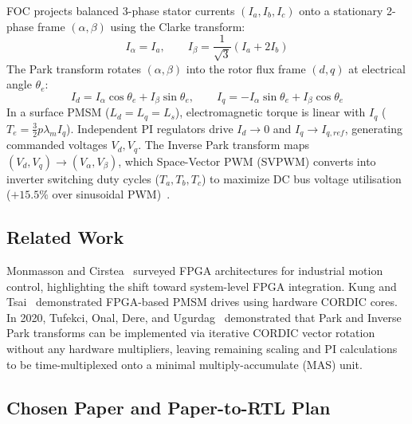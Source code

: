 \documentclass[11pt,a4paper]{article}
\begin{document}
FOC projects balanced 3-phase stator currents $(I_a, I_b, I_c)$ onto a stationary 2-phase frame $(\alpha, \beta)$ using the Clarke transform:
\begin{equation}
I_\alpha = I_a, \qquad I_\beta = \frac{1}{\sqrt{3}}(I_a + 2I_b)
\end{equation}
The Park transform rotates $(\alpha, \beta)$ into the rotor flux frame $(d, q)$ at electrical angle $\theta_e$:
\begin{equation}
I_d = I_\alpha \cos\theta_e + I_\beta \sin\theta_e, \qquad I_q = -I_\alpha \sin\theta_e + I_\beta \cos\theta_e
\end{equation}
In a surface PMSM ($L_d = L_q = L_s$), electromagnetic torque is linear with $I_q$ ($T_e = \frac{3}{2} p \lambda_m I_q$). Independent PI regulators drive $I_d \to 0$ and $I_q \to I_{q,ref}$, generating commanded voltages $V_d, V_q$. The Inverse Park transform maps $(V_d, V_q) \to (V_\alpha, V_\beta)$, which Space-Vector PWM (SVPWM) converts into inverter switching duty cycles ($T_a, T_b, T_c$) to maximize DC bus voltage utilisation ($+15.5\%$ over sinusoidal PWM)~\cite{holmes2003}.

\subsection{Related Work}
Monmasson and Cirstea~\cite{monmasson2007} surveyed FPGA architectures for industrial motion control, highlighting the shift toward system-level FPGA integration. Kung and Tsai~\cite{kung2007} demonstrated FPGA-based PMSM drives using hardware CORDIC cores. In 2020, Tufekci, Onal, Dere, and Ugurdag~\cite{tufekci2020} demonstrated that Park and Inverse Park transforms can be implemented via iterative CORDIC vector rotation without any hardware multipliers, leaving remaining scaling and PI calculations to be time-multiplexed onto a minimal multiply-accumulate (MAS) unit.

\subsection{Chosen Paper and Paper-to-RTL Plan}
\end{document}
